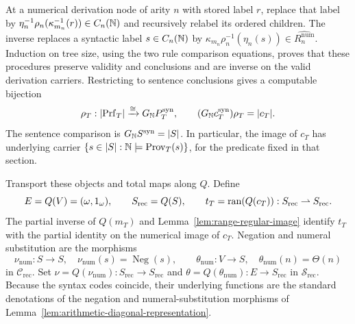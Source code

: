At a numerical derivation node of arity $n$ with stored label $r$,
replace that label by
$\eta_n^{-1}\rho_n(\kappa_{m_n}^{-1}(r))\in C_n(\mathbb N)$ and
recursively relabel its ordered children. The inverse replaces a
syntactic label $s\in C_n(\mathbb N)$ by
$\kappa_{m_n}\rho_n^{-1}(\eta_n(s))\in\widehat{R_n^{\mathrm{num}}}$.
Induction on tree size, using the two rule
comparison equations, proves that these procedures preserve validity
and conclusions and are inverse on the valid derivation carriers.
Restricting to sentence conclusions gives a computable bijection
\[
 \rho_T:|\mathrm{Prf}_T|\xrightarrow{\cong}G_{\mathbb N}P_T^{\mathrm{syn}},
 \qquad
 (G_{\mathbb N}c_T^{\mathrm{syn}})\rho_T=|c_T|.
\]
The sentence comparison is $G_{\mathbb N}S^{\mathrm{syn}}=|S|$.
In particular, the image of $c_T$ has underlying carrier
$\{s\in|S|:\mathbb N\models\operatorname{Prov}_T(s)\}$, for the
predicate fixed in that section.

Transport these objects and total maps along $Q$.
Define
\[
 E=Q(V)=(\omega,1_\omega),\qquad
 S_{\mathrm{rec}}=Q(S),\qquad
 t_T=\operatorname{ran}(Q(c_T)):S_{\mathrm{rec}}\rightharpoonup S_{\mathrm{rec}}.
\]
The partial inverse of $Q(m_T)$ and
Lemma~\ref{lem:range-regular-image} identify $t_T$ with the partial
identity on the numerical image of $c_T$.
Negation and numeral substitution are the morphisms
\[
 \nu_{\mathrm{num}}:S\to S,\quad
    \nu_{\mathrm{num}}(s)=\operatorname{Neg}(s),\qquad
 \theta_{\mathrm{num}}:V\to S,\quad
    \theta_{\mathrm{num}}(n)=\Theta(n)
\]
in $\mathcal C_{\mathrm{rec}}$. Set
$\nu=Q(\nu_{\mathrm{num}}):S_{\mathrm{rec}}\to S_{\mathrm{rec}}$
and $\theta=Q(\theta_{\mathrm{num}}):E\to S_{\mathrm{rec}}$
in $\mathscr S_{\mathrm{rec}}$.
Because the syntax codes coincide, their underlying functions are
the standard denotations of the negation and numeral-substitution
morphisms of Lemma~\ref{lem:arithmetic-diagonal-representation}.
